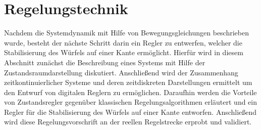 \ifx\FORMAT\undefined


\fi

\chapter{Regelungstechnik}
Nachdem die Systemdynamik mit Hilfe von Bewegungsgleichungen beschrieben wurde, besteht der nächste Schritt darin ein Regler zu entwerfen, welcher die Stabilisierung des Würfels auf einer Kante ermöglicht. Hierfür wird in diesem Abschnitt zunächst die Beschreibung eines Systems mit Hilfe der Zustandsraumdarstellung diskutiert. Anschließend wird der Zusammenhang zeitkontinuierlicher Systeme und deren zeitdiskreten Darstellungen ermittelt um den Entwurf von digitalen Reglern zu ermöglichen. Daraufhin werden die Vorteile von Zustandsregler gegenüber klassischen Regelungsalgorithmen erläutert und ein Regler für die Stabilisierung des Würfels auf einer Kante entworfen. Anschließend wird diese Regelungsvorschrift an der reellen Regelstrecke erprobt und validiert.

\newpage

\newpage

\newpage

\newpage


\ifx\FORMAT\undefined

\fi
